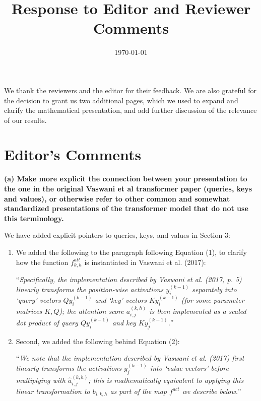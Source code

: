 \documentclass[11pt,a4paper]{article}
\title{Response to Editor and Reviewer Comments}
\date{\today}
\newcommand\response[1]{{\color{blue}#1}}
\newcommand\newtext[1]{``\textit{#1}''}
\newcommand\original[1]{\textbf{#1}}
\begin{document}
\maketitle 

\response{We thank the reviewers and the editor for their feedback.
We are also grateful for the decision to grant us two additional pages, which we used to expand and clarify the mathematical presentation, and add further discussion of the relevance of our results.}

\section{Editor's Comments}

\original{(a) Make more explicit the connection between your presentation to the one
in the original Vaswani et al transformer paper (queries, keys and values),
or otherwise refer to other common and somewhat standardized presentations
of the transformer model that do not use this terminology.}

\response{We have added explicit pointers to queries, keys, and values in Section 3:}

\begin{enumerate}
    \item \response{We added the following to the paragraph following Equation (1), to clarify how the function $f^{att}_{k,h}$ is instantiated in Vaswani et al. (2017):}

\response{\newtext{Specifically, the implementation described by Vaswani et al. (2017, p. 5) linearly transforms the position-wise activations $y_i^{(k-1)}$ separately into `query' vectors $Q y_i^{(k-1)}$ and `key' vectors $K y_i^{(k-1)}$ (for some parameter matrices $K, Q$); the attention score $a_{i,j}^{(k,h)}$ is then implemented as a scaled dot product of query $Q y_i^{(k-1)}$ and key $K y_j^{(k-1)}$.}}
\newline

\item \response{Second, we added the following behind Equation (2):}

\response{\newtext{We note that the implementation described by Vaswani et al. (2017) first linearly transforms the activations $y_j^{(k-1)}$ into `value vectors' before multiplying with $ \hat{a}_{i,j}^{(k,h)}$; this is mathematically equivalent to applying this linear transformation to $b_{i,k,h}$ as part of the map $f^{act}$ we describe below.}}
\end{enumerate}
\end{document}
